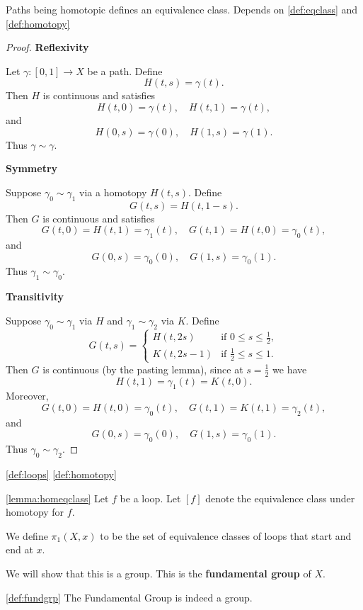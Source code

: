 \begin{lemma}
  \label{lemma:homeqclass}
  Paths being homotopic defines an equivalence class. Depends on \ref{def:eqclass} and \ref{def:homotopy}
\end{lemma}

\begin{proof}
  \textbf{Reflexivity}
  
Let $\gamma : [0,1] \to X$ be a path. Define
$$
H(t,s) = \gamma(t).
$$
Then $H$ is continuous and satisfies
$$
H(t,0) = \gamma(t), \quad H(t,1) = \gamma(t),
$$
and
$$
H(0,s) = \gamma(0), \quad H(1,s) = \gamma(1).
$$
Thus $\gamma \sim \gamma$.

\textbf{Symmetry}

Suppose $\gamma_0 \sim \gamma_1$ via a homotopy $H(t,s)$. Define
$$
G(t,s) = H(t, 1 - s).
$$
Then $G$ is continuous and satisfies
$$
G(t,0) = H(t,1) = \gamma_1(t), \quad G(t,1) = H(t,0) = \gamma_0(t),
$$
and
$$
G(0,s) = \gamma_0(0), \quad G(1,s) = \gamma_0(1).
$$
Thus $\gamma_1 \sim \gamma_0$.

\textbf{Transitivity}

Suppose $\gamma_0 \sim \gamma_1$ via $H$ and $\gamma_1 \sim \gamma_2$ via $K$. Define
$$
G(t,s) =
\begin{cases}
H(t, 2s) & \text{if } 0 \le s \le \tfrac{1}{2}, \\
K(t, 2s - 1) & \text{if } \tfrac{1}{2} \le s \le 1.
\end{cases}
$$
Then $G$ is continuous (by the pasting lemma), since at $s = \tfrac{1}{2}$ we have
$$
H(t,1) = \gamma_1(t) = K(t,0).
$$
Moreover,
$$
G(t,0) = H(t,0) = \gamma_0(t), \quad G(t,1) = K(t,1) = \gamma_2(t),
$$
and
$$
G(0,s) = \gamma_0(0), \quad G(1,s) = \gamma_0(1).
$$
Thus $\gamma_0 \sim \gamma_2$.
\end{proof}


\begin{definition}
  \label{def:fundgrp}
  \ref{def:loops}
  \ref{def:homotopy}

  \ref{lemma:homeqclass}
  Let $f$ be a loop. 
  Let $[f]$ denote the equivalence class under homotopy for $f$.
  
  We define $\pi_1(X,x)$ to be the set of equivalence classes of loops that start and end at $x$. 

  We will show that this is a group. This is the \textbf{fundamental group} of $X$.
\end{definition}

\begin{lemma}

  \ref{def:fundgrp}
  The Fundamental Group is indeed a group.

\end{lemma}


